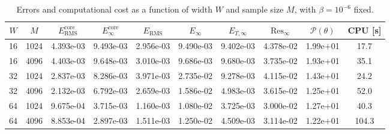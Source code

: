 \begin{table}[htbp]
\centering
\small
\setlength{\tabcolsep}{4pt}
\caption{Errors and computational cost as a function of width $W$ and sample size $M$, with $\beta=10^{-6}$ fixed.}
\label{tab:4.main}
\begin{tabular}{cccccccccc}
\toprule
$W$ & $M$ & $E_{\mathrm{RMS}}^{\mathrm{core}}$ & $E_{\infty}^{\mathrm{core}}$ & $E_{\mathrm{RMS}}$ & $E_{\infty}$ & $E_{T,\infty}$ & $\mathrm{Res}_{\infty}$ & $\mathcal P(\theta)$ & CPU [s] \\
\midrule
16 & 1024 & 4.393e-03 & 9.493e-03 & 2.956e-03 & 9.490e-03 & 9.402e-03 & 4.378e-02 & 1.99e+01 & 17.7 \\
16 & 4096 & 4.403e-03 & 9.648e-03 & 3.010e-03 & 9.686e-03 & 9.680e-03 & 3.735e-02 & 1.93e+01 & 35.1 \\
32 & 1024 & 2.837e-03 & 8.286e-03 & 3.971e-03 & 2.735e-02 & 9.278e-03 & 4.115e-02 & 1.43e+01 & 24.2 \\
32 & 4096 & 2.132e-03 & 6.792e-03 & 2.659e-03 & 1.586e-02 & 4.983e-03 & 3.615e-02 & 1.25e+01 & 52.0 \\
64 & 1024 & 9.675e-04 & 3.715e-03 & 1.160e-03 & 1.080e-02 & 3.725e-03 & 3.000e-02 & 1.27e+01 & 40.3 \\
64 & 4096 & 8.853e-04 & 2.897e-03 & 1.511e-03 & 1.250e-02 & 4.509e-03 & 3.114e-02 & 1.22e+01 & 104.3 \\
\bottomrule
\end{tabular}
\end{table}
